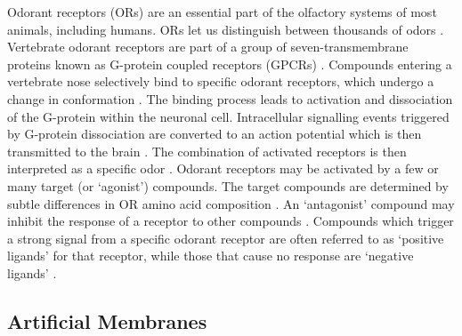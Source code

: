 \documentclass[
  a4paper,
]{scrbook}
\begin{document}
Odorant receptors (ORs) are an essential part of the olfactory systems
of most animals, including humans. ORs let us distinguish between
thousands of odors \autocite{Buck1991,Dung2018,Yang2018,Kim2022a}.
Vertebrate odorant receptors are part of a group of seven-transmembrane
proteins known as G-protein coupled receptors (GPCRs)
\autocite{Buck1991,Glatz2011,Dung2018,Wicher2021}. Compounds entering a
vertebrate nose selectively bind to specific odorant receptors, which
undergo a change in conformation \autocite{Dung2018,Kim2022a}. The
binding process leads to activation and dissociation of the G-protein
within the neuronal cell. Intracellular signalling events triggered by
G-protein dissociation are converted to an action potential which is
then transmitted to the brain \autocite{Buck1991,Glatz2011,Zhang2021}.
The combination of activated receptors is then interpreted as a specific
odor \autocite{Sato2014,Kwon2015,Hurot2020,Kim2022a}. Odorant receptors
may be activated by a few or many target (or `agonist') compounds. The
target compounds are determined by subtle differences in OR amino acid
composition \autocite{Carraher2015,Yang2018,Goodwin2021}. An
`antagonist' compound may inhibit the response of a receptor to other
compounds \autocite{Lee2012,Carraher2015}. Compounds which trigger a
strong signal from a specific odorant receptor are often referred to as
`positive ligands' for that receptor, while those that cause no response
are `negative ligands'
\autocite{Murugathas2019a,Murugathas2020,Yoo2022}.

\hypertarget{sec-artificial-membranes}{%
\subsection{Artificial Membranes}\label{sec-artificial-membranes}}
\end{document}

